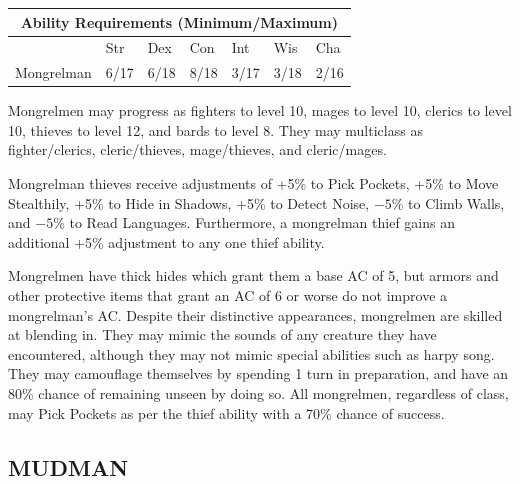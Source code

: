 \begin{multicols}{2}
\noindent \begin{minipage}{\columnwidth}

\noindent \begin{tabular}{|p{}|p{}|p{}|p{}|p{}|p{}|p{}|}
\multicolumn{7}{c}{Ability Requirements (Minimum/Maximum)} \\
\hline
	& Str	& Dex	& Con	& Int	& Wis	& Cha	\\
\hline\hline
\rowcolor[gray]{.9}Mongrelman	& 6/17	& 6/18	& 8/18	& 3/17	& 3/18	& 2/16	\\
\hline
\end{tabular}

\end{minipage}

Mongrelmen may progress as fighters to level 10, mages to level 10, clerics to level 10, thieves to level 12, and bards to level 8. They may multiclass as fighter/clerics, cleric/thieves, mage/thieves, and cleric/mages.

Mongrelman thieves receive adjustments of +5\% to Pick Pockets, +5\% to Move Stealthily, +5\% to Hide in Shadows, +5\% to Detect Noise, $-5$\% to Climb Walls, and $-5$\% to Read Languages. Furthermore, a mongrelman thief gains an additional +5\% adjustment to any one thief ability.

Mongrelmen have thick hides which grant them a base AC of 5, but armors and other protective items that grant an AC of 6 or worse do not improve a mongrelman's AC. Despite their distinctive appearances, mongrelmen are skilled at blending in. They may mimic the sounds of any creature they have encountered, although they may not mimic special abilities such as harpy song. They may camouflage themselves by spending 1 turn in preparation, and have an 80\% chance of remaining unseen by doing so. All mongrelmen, regardless of class, may Pick Pockets as per the thief ability with a 70\% chance of success.

\noindent
\begin{minipage}{\columnwidth}

\vspace{1em}

\subsection{MUDMAN}


\end{minipage}
\end{multicols}
